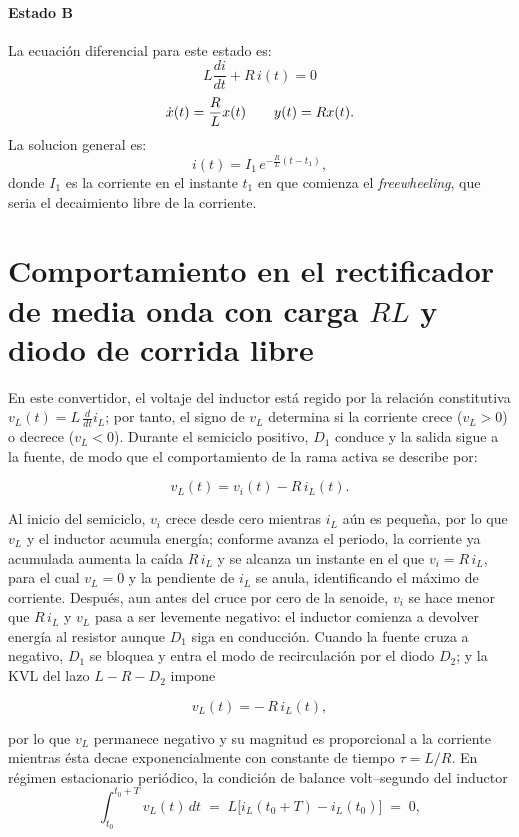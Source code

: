 \documentclass[conference]{IEEEtran}
\begin{document}
\paragraph{Estado B}
La ecuación diferencial para este estado es:
\[
L\frac{di}{dt} + R\,i(t) = 0
\]
\[
\dot{x}(t)
=
\-\dfrac{R}{L}
x(t)
\qquad
y(t)=Rx(t).
\]
La solucion general es:
\[
i(t)=I_1\,e^{-\frac{R}{L}(t-t_1)},
\]
donde \(I_1\) es la corriente en el instante \(t_1\) en que comienza el \emph{freewheeling}, que seria el decaimiento libre de la corriente.

\section{Comportamiento en el rectificador de media onda con carga $RL$ y diodo de corrida libre}
En este convertidor, el voltaje del inductor está regido por la relación constitutiva $v_L(t)=L\,\tfrac{d}{dt}i_L$; por tanto, el signo de $v_L$ determina si la corriente crece ($v_L>0$) o decrece ($v_L<0$). Durante el semiciclo positivo, $D_1$ conduce y la salida sigue a la fuente, de modo que el comportamiento de la rama activa se describe por:

\begin{equation*}
	v_L(t)=v_i(t)-R\,i_L(t).
\end{equation*}

Al inicio del semiciclo, $v_i$ crece desde cero mientras $i_L$ aún es pequeña, por lo que $v_L$ y el inductor acumula energía; conforme avanza el periodo, la corriente ya acumulada aumenta la caída $R\,i_L$ y se alcanza un instante en el que $v_i=R\,i_L$, para el cual $v_L=0$ y la pendiente de $i_L$ se anula, identificando el máximo de corriente. Después, aun antes del cruce por cero de la senoide, $v_i$ se hace menor que $R\,i_L$ y $v_L$ pasa a ser levemente negativo: el inductor comienza a devolver energía al resistor aunque $D_1$ siga en conducción. Cuando la fuente cruza a negativo, $D_1$ se bloquea y entra el modo de recirculación por el diodo $D_2$; y la KVL del lazo $L\!-\!R\!-\!D_2$ impone

\begin{equation*}
	v_L(t)=-\,R\,i_L(t),
\end{equation*}

por lo que $v_L$ permanece negativo y su magnitud es proporcional a la corriente mientras ésta decae exponencialmente con constante de tiempo $\tau=L/R$. En régimen estacionario periódico, la condición de balance volt–segundo del inductor
\begin{equation*}
	\int_{t_0}^{t_0+T} v_L(t)\,dt \;=\; L\big[i_L(t_0+T)-i_L(t_0)\big]\;=\;0,
\end{equation*}
\end{document}
